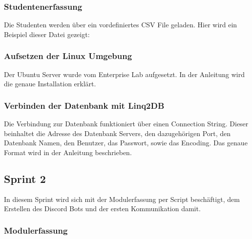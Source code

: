 \documentclass[a4paper, table]{article}
\begin{document}
\subsubsection{Studentenerfassung}

Die Studenten werden über ein vordefiniertes CSV File geladen.
Hier wird ein Beispiel dieser Datei gezeigt:





\subsubsection{Aufsetzen der Linux Umgebung}

Der Ubuntu Server wurde vom Enterprise Lab aufgesetzt.
In der Anleitung wird die genaue Installation erklärt.



\subsubsection{Verbinden der Datenbank mit Linq2DB}

Die Verbindung zur Datenbank funktioniert über einen Connection String.
Dieser beinhaltet die Adresse des Datenbank Servers, den dazugehörigen Port, den Datenbank Namen, den Benutzer, das Passwort, sowie das Encoding.
Das genaue Format wird in der Anleitung beschrieben.

\newpage
\subsection{Sprint 2}
In diesem Sprint wird sich mit der Modulerfassung per Script beschäftigt, 
dem Erstellen des Discord Bots und der ersten Kommunikation damit.

\subsubsection{Modulerfassung}
\end{document}
